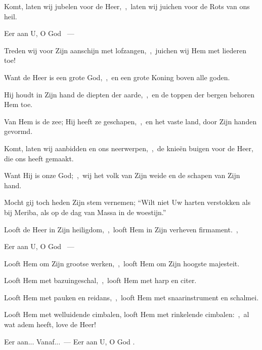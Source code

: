 \documentclass[12pt,twoside,a5paper]{article}
\begin{document}
\begin{halfparskip}
   

  Komt, laten wij jubelen voor de Heer,~\sep\ laten wij juichen voor de Rots van ons heil.

  Eer aan U, O God ~---  

  Treden wij voor Zijn aanschijn met lofzangen,~\sep\ juichen wij Hem met liederen toe!

  Want de Heer is een grote God,~\sep\ en een grote Koning boven alle goden.

  Hij houdt in Zijn hand de diepten der aarde,~\sep\ en de toppen der bergen behoren Hem toe.

  Van Hem is de zee; Hij heeft ze geschapen,~\sep\ en het vaste land, door Zijn handen gevormd.

  Komt, laten wij aanbidden en ons neerwerpen,~\sep\ de knieën buigen voor de Heer, die ons heeft gemaakt.

  Want Hij is onze God;~\sep\ wij het volk van Zijn weide en de schapen van Zijn hand.

  Mocht gij toch heden Zijn stem vernemen; ``Wilt niet Uw harten verstokken als bij Meriba, als op de dag van Massa in de woestijn.''
\end{halfparskip}

\begin{halfparskip}
   

  Looft de Heer in Zijn heiligdom,~\sep\ looft Hem in Zijn verheven firmament.~\sep

  Eer aan U, O God ~---  

  Looft Hem om Zijn grootse werken,~\sep\ looft Hem om Zijn hoogste majesteit.

  Looft Hem met bazuingeschal,~\sep\ looft Hem met harp en citer.

  Looft Hem met pauken en reidans,~\sep\ looft Hem met snaarinstrument en schalmei.

  Looft Hem met welluidende cimbalen, looft Hem met rinkelende cimbalen:~\sep\ al wat adem heeft, love de Heer!
\end{halfparskip}

\begin{halfparskip}
   Eer aan... Vanaf...~--- Eer aan U, O God .
\end{halfparskip}
\end{document}
